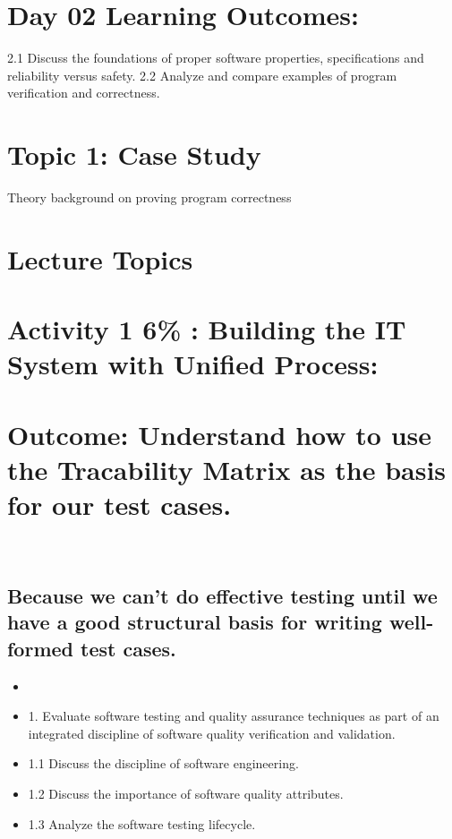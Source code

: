 \section{Day 02 Learning Outcomes:}

2.1 Discuss the foundations of proper software properties, specifications and reliability versus safety.
2.2 Analyze and compare examples of program verification and correctness.


\section{Topic 1: Case Study}
Theory background on proving program correctness

\section{Lecture Topics}

\section{Activity 1  6\% : Building the IT System with Unified Process:}

\section{Outcome: Understand how to use the Tracability Matrix as the basis for our test cases.}
\\

\subsection{Because we can't do effective testing until we have a good structural basis for writing well-formed test cases.}

\begin{itemize}
    \item 

 \item 1. Evaluate software testing and quality assurance techniques as part of an integrated discipline of software
quality verification and validation.
 \item 1.1 Discuss the discipline of software engineering.
 \item 1.2 Discuss the importance of software quality attributes.
 \item 1.3 Analyze the software testing lifecycle.

\end{itemize}